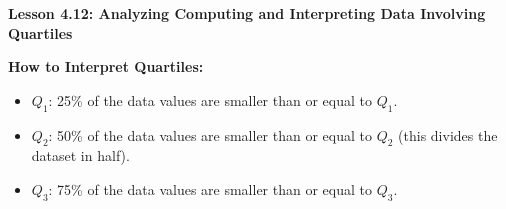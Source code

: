 \begin{center}
\textbf{Lesson 4.12: Analyzing Computing and Interpreting Data Involving Quartiles}
\end{center}

\vspace*{-1.5ex}

\noindent\textbf{How to Interpret Quartiles:}  
\begin{itemize}
    \item \(Q_1\): 25\% of the data values are smaller than or equal to \(Q_1\).  
    \item \(Q_2\): 50\% of the data values are smaller than or equal to \(Q_2\) (this divides the dataset in half).  
    \item \(Q_3\): 75\% of the data values are smaller than or equal to \(Q_3\).  
\end{itemize}
